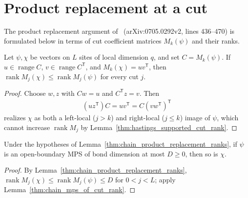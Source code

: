 \section{Product replacement at a cut}

The product replacement argument of~\cite{Schuch2008EntropyScaling}
(arXiv:0705.0292v2, lines 436--470) is formulated below in terms of cut
coefficient matrices $M_k(\psi)$ and their ranks.

\begin{lemma}
    \label{thm:chain_product_replacement_ranks}
    \leanok
    Let $\psi,\chi$ be vectors on $L$ sites of local dimension $q$, and set
    $C=M_k(\psi)$. If $u\in\operatorname{range}C$,
    $v\in\operatorname{range}C^{\mathsf T}$, and $M_k(\chi)=uv^{\mathsf T}$,
    then $\operatorname{rank}M_j(\chi)\le\operatorname{rank}M_j(\psi)$ for every
    cut $j$.
\end{lemma}
\begin{proof}\leanok
    Choose $w,z$ with $Cw=u$ and $C^{\mathsf T}z=v$. Then
    \begin{align}
        \label{eq:chain_product_replacement_local_maps}
        (uz^{\mathsf T})C=uv^{\mathsf T}
        =C{(vw^{\mathsf T})}^{\mathsf T}
    \end{align}
    realizes $\chi$ as both a left-local ($j>k$) and right-local ($j\le k$)
    image of $\psi$, which cannot increase $\operatorname{rank}M_j$ by
    Lemma~\ref{thm:hastings_supported_cut_rank}.
\end{proof}

\begin{lemma}
    \label{thm:chain_product_replacement_mps}
    \leanok
    Under the hypotheses of Lemma~\ref{thm:chain_product_replacement_ranks},
    if $\psi$ is an open-boundary MPS of bond dimension at most $D\ge0$, then
    so is $\chi$.
\end{lemma}
\begin{proof}\leanok
    By Lemma~\ref{thm:chain_product_replacement_ranks},
    $\operatorname{rank}M_j(\chi)\le\operatorname{rank}M_j(\psi)\le D$ for
    $0<j<L$; apply Lemma~\ref{thm:chain_mps_of_cut_rank}.
\end{proof}

